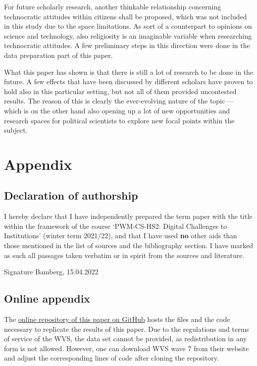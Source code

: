 \documentclass[
  12pt,
  english,
]{article}
\begin{document}
For future scholarly research, another thinkable relationship concerning
technocratic attitudes within citizens shall be proposed, which was not
included in this study due to the space limitations. As sort of a
counterpart to opinions on science and technology, also religiosity is
an imaginable variable when researching technocratic attitudes. A few
preliminary steps in this direction were done in the data preparation
part of this paper.

What this paper has shown is that there is still a lot of research to be
done in the future. A few effects that have been discussed by different
scholars have proven to hold also in this particular setting, but not
all of them provided uncontested results. The reason of this is clearly
the ever-evolving nature of the topic --- which is on the other hand
also opening up a lot of new opportunities and research spaces for
political scientists to explore new focal points within the subject.

\newpage{}

\hypertarget{appendix}{%
\section{Appendix}\label{appendix}}

\hypertarget{declaration-of-authorship}{%
\subsection{Declaration of authorship}\label{declaration-of-authorship}}

I hereby declare that I have independently prepared the term paper with
the title within the framework of the course `PWM-CS-HS2: Digital
Challenges to Institutions' (winter term 2021/22), and that I have used
\textbf{no} other aids than those mentioned in the list of sources and
the bibliography section. I have marked as such all passages taken
verbatim or in spirit from the sources and literature.

\vfill

Signature \hfill Bamberg, 15.04.2022

\newpage{}

\hypertarget{online-appendix}{%
\subsection{Online appendix}\label{online-appendix}}

The \href{https://github.com/FWisniewski44/digital-challenges}{online
repository of this paper on GitHub} hosts the files and the code
necessary to replicate the results of this paper. Due to the regulations
and terms of service of the WVS, the data set cannot be provided, as
redistribution in any form is not allowed. However, one can download WVS
wave 7 from their website and adjust the corresponding lines of code
after cloning the repository.
\end{document}
